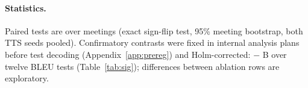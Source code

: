 \paragraph{Statistics.} Paired tests are over meetings (exact sign-flip test, 95\% meeting bootstrap, both TTS seeds
pooled). Confirmatory contrasts were fixed in internal analysis plans before test decoding (Appendix~\ref{app:prereg})
and Holm-corrected: \sys{} $-$ B over twelve BLEU tests (Table~\ref{tab:sig}); differences between ablation rows
are exploratory.

